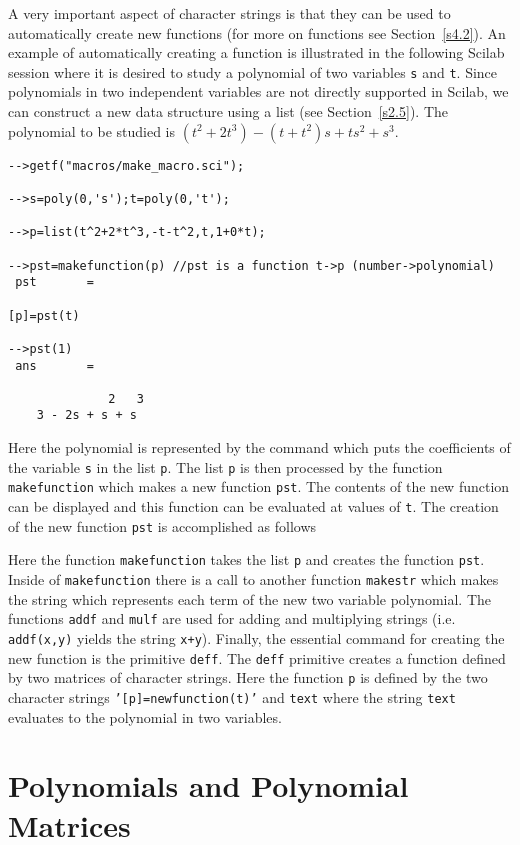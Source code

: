 	A very important aspect of character strings is that they
can be used to automatically create new functions (for more on functions
see Section~\ref{s4.2}).  An example of automatically creating a 
function is illustrated in the following Scilab session where it is
desired to study a polynomial of two variables {\tt s} and {\tt t}.
Since polynomials in two independent variables are not directly 
supported in Scilab, we can construct a new data structure using
a list (see Section~\ref{s2.5}).
The polynomial to be studied is $(t^2+2t^3)-(t+t^2)s+ts^2+s^3$.
\begin{verbatim}
-->getf("macros/make_macro.sci");
 
-->s=poly(0,'s');t=poly(0,'t');
 
-->p=list(t^2+2*t^3,-t-t^2,t,1+0*t);
 
-->pst=makefunction(p) //pst is a function t->p (number->polynomial)
 pst       =
 
[p]=pst(t)
 
-->pst(1)
 ans       =
 
              2   3  
    3 - 2s + s + s   
\end{verbatim}
Here the polynomial is represented by the command which puts
the coefficients of the variable {\tt s} in the list {\tt p}.
The list {\tt p} is then processed by the function {\tt makefunction}
which makes a new function {\tt pst}.  The contents of the new function
can be displayed and this function can be evaluated
at values of {\tt t}.  The creation of the new function {\tt pst}
is accomplished as follows



Here the function {\tt makefunction} takes the list {\tt p} and creates the
function {\tt pst}.  Inside of {\tt makefunction} there is a call to another 
function {\tt makestr} which makes the string which represents each 
term of the new two variable polynomial.  The functions {\tt addf} and
{\tt mulf} are used for adding and multiplying strings (i.e. 
{\tt addf(x,y)} yields the string {\tt x+y}).  Finally, the 
essential command for creating the new function 
is the primitive {\tt deff}.  The {\tt deff} primitive 
creates a function defined by two matrices
of character strings.  Here the 
function {\tt p} is defined by the two character strings
{\tt '[p]=newfunction(t)'} and {\tt text} where the string {\tt text}
evaluates to the polynomial in two variables.

\section{Polynomials and Polynomial Matrices}
\label{s2.4}

